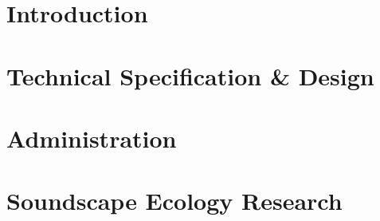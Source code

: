 \documentclass[12pt, twoside]{article}
\begin{document}
  
  \pagestyle{empty}                                     %
  \tableofcontents
  \newpage


  \pagestyle{plain} %
  \setcounter{page}{1}

  \section{Introduction}
  
  
  
  \newpage

  \section{Technical Specification \& Design}
  
  
  
  
  
  
  
  
  
  
  
  
  
  
  
  
  \newpage

  \section{Administration}
  
  
  
  
  \newpage

  \section{Soundscape Ecology Research}
  
  
  
  
  \newpage

  \thispagestyle{empty}
  \printbibliography
\end{document}
